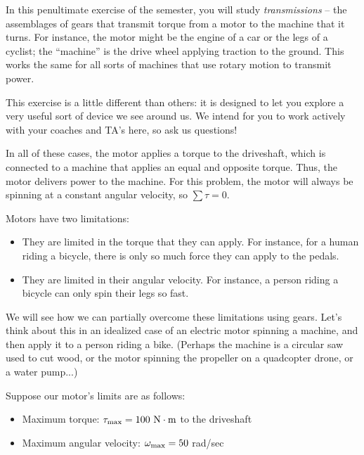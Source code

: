 \documentclass[12pt]{article}
\begin{document}
\Large
\centerline{}
\normalsize
\centerline{}

In this penultimate exercise of the semester, you will study {\it transmissions} -- the assemblages of gears that transmit torque from a motor to the machine that it turns. For instance, the motor might be the engine of a car or the legs of a cyclist; the ``machine'' is the drive wheel applying traction to the ground. This works the same for all sorts of machines that use rotary motion to transmit power.

This exercise is a little different than others: it is designed to let you explore a very useful sort of device we see around us. 
We intend for you to work actively with your coaches and TA's here, so ask us questions!

In all of these cases, the motor applies a torque to the driveshaft, which is connected to a machine that applies an equal and opposite torque. Thus, the motor delivers power to the machine. For this problem, the motor will always be spinning at a constant angular velocity, so $\sum \tau = 0$.

Motors have two limitations: 

\begin{itemize}
	\item They are limited in the torque that they can apply. For instance, for a human riding a bicycle, there is only so much force they can apply to the pedals.
	\item They are limited in their angular velocity. For instance, a person riding a bicycle can only spin their legs so fast.
\end{itemize}

		We will see how we can partially overcome these limitations using gears. Let's think about this in an idealized case of an electric motor spinning a machine, and then apply it to a person riding a bike. (Perhaps the machine is a circular saw used to cut wood, or the motor spinning the propeller
		on a quadcopter drone, or a water pump...)

Suppose our motor's limits are as follows:

		\begin{itemize}
			\item Maximum torque: $\tau_{\rm {max}}=100~\rm N \cdot \rm m$ to the driveshaft
			\item Maximum angular velocity: $\omega_{\rm max} = 50$ rad/sec
		\end{itemize}
\end{document}
